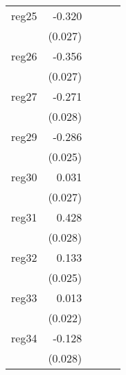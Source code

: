 {\begin{longtable}{l*{4}{D{.}{.}{-1}}}
\addlinespace
reg25       &      -0.320\sym{***}&                     &                     &                     \\
            &     (0.027)         &                     &                     &                     \\
\addlinespace
reg26       &      -0.356\sym{***}&                     &                     &                     \\
            &     (0.027)         &                     &                     &                     \\
\addlinespace
reg27       &      -0.271\sym{***}&                     &                     &                     \\
            &     (0.028)         &                     &                     &                     \\
\addlinespace
reg29       &      -0.286\sym{***}&                     &                     &                     \\
            &     (0.025)         &                     &                     &                     \\
\addlinespace
reg30       &       0.031         &                     &                     &                     \\
            &     (0.027)         &                     &                     &                     \\
\addlinespace
reg31       &       0.428\sym{***}&                     &                     &                     \\
            &     (0.028)         &                     &                     &                     \\
\addlinespace
reg32       &       0.133\sym{***}&                     &                     &                     \\
            &     (0.025)         &                     &                     &                     \\
\addlinespace
reg33       &       0.013         &                     &                     &                     \\
            &     (0.022)         &                     &                     &                     \\
\addlinespace
reg34       &      -0.128\sym{***}&                     &                     &                     \\
            &     (0.028)         &                     &                     &                     \\

\end{longtable}}
